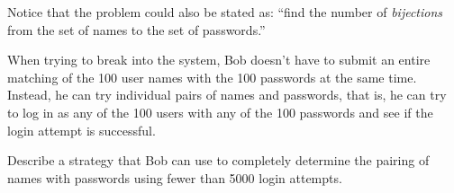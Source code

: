 \documentclass[11pt,twoside]{article}
\begin{document}
\begin{problem}
{    Notice that the problem could also be stated as: ``find the number
    of \emph{bijections} from the set of names to the set of
    passwords.''}
  
  \ppart When trying to break into the system, Bob doesn't have to
  submit an entire matching of the 100 user names with the 100
  passwords at the same time. Instead, he can try individual pairs of
  names and passwords, that is, he can try to log in as any of the 100
  users with any of the 100 passwords and see if the login attempt is
  successful.
  
  Describe a strategy that Bob can use to completely determine the pairing
  of names with passwords using fewer than 5000 login attempts.
  

\eparts
\end{problem}

\end{document}
